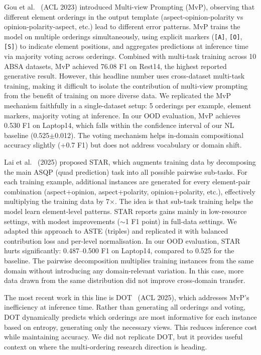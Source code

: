 \documentclass[12pt,a4paper]{report}
\begin{document}
Gou et al.~\cite{gou2023mvp} (ACL 2023) introduced Multi-view Prompting (MvP), observing that different element orderings in the output template (aspect-opinion-polarity vs opinion-polarity-aspect, etc.) lead to different error patterns. MvP trains the model on multiple orderings simultaneously, using explicit markers (\texttt{[A]}, \texttt{[O]}, \texttt{[S]}) to indicate element positions, and aggregates predictions at inference time via majority voting across orderings. Combined with multi-task training across 10 ABSA datasets, MvP achieved 76.08 F1 on Rest14, the highest reported generative result. However, this headline number uses cross-dataset multi-task training, making it difficult to isolate the contribution of multi-view prompting from the benefit of training on more diverse data. We replicated the MvP mechanism faithfully in a single-dataset setup: 5 orderings per example, element markers, majority voting at inference. In our OOD evaluation, MvP achieves 0.530 F1 on Laptop14, which falls within the confidence interval of our NL baseline (0.525$\pm$0.012). The voting mechanism helps in-domain compositional accuracy slightly (+0.7 F1) but does not address vocabulary or domain shift.

Lai et al.~\cite{xie2025star} (2025) proposed STAR, which augments training data by decomposing the main ASQP (quad prediction) task into all possible pairwise sub-tasks. For each training example, additional instances are generated for every element-pair combination (aspect+opinion, aspect+polarity, opinion+polarity, etc.), effectively multiplying the training data by 7$\times$. The idea is that sub-task training helps the model learn element-level patterns. STAR reports gains mainly in low-resource settings, with modest improvements ($\sim$1 F1 point) in full-data settings. We adapted this approach to ASTE (triples) and replicated it with balanced contribution loss and per-level normalisation. In our OOD evaluation, STAR hurts significantly: 0.487--0.500 F1 on Laptop14, compared to 0.525 for the baseline. The pairwise decomposition multiplies training instances from the same domain without introducing any domain-relevant variation. In this case, more data drawn from the same distribution did not improve cross-domain transfer.

The most recent work in this line is DOT~\cite{dot2025} (ACL 2025), which addresses MvP's inefficiency at inference time. Rather than generating all orderings and voting, DOT dynamically predicts which orderings are most informative for each instance based on entropy, generating only the necessary views. This reduces inference cost while maintaining accuracy. We did not replicate DOT, but it provides useful context on where the multi-ordering research direction is heading.
\end{document}

